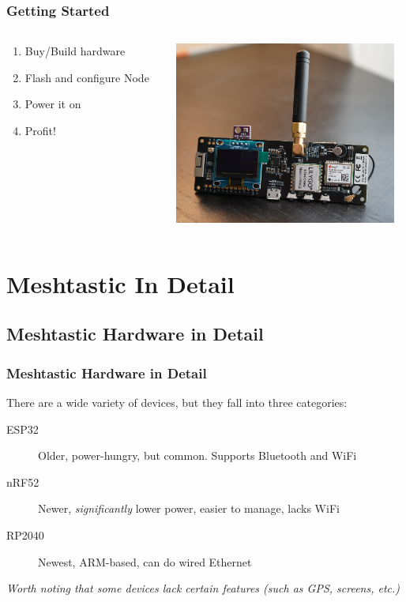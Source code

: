 \documentclass[aspectratio=169]{beamer}
\begin{document}
\begin{frame}[fragile]
  \frametitle{Getting Started}
  \begin{columns}[]
    \begin{column}[T]{0.45\paperwidth}
      \begin{enumerate}%
        \item{Buy/Build hardware}
        \item{Flash and configure Node}
        \item{Power it on}
        \item{Profit!}
      \end{enumerate}
    \end{column}
    \begin{column}[T]{0.45\paperwidth}
      \includegraphics[height=6cm,keepaspectratio]{images/tbeam.jpg}
    \end{column}
  \end{columns}
\end{frame}

\section{Meshtastic In Detail}
\subsection{Meshtastic Hardware in Detail}
\begin{frame}[fragile]
  \frametitle{Meshtastic Hardware in Detail}
  There are a wide variety of devices, but they fall into three categories:
  \begin{description}%
    \item[ESP32]{Older, power-hungry, but common. Supports Bluetooth and WiFi}
    \item[nRF52]{Newer, \emph{significantly} lower power, easier to manage, lacks WiFi}
    \item[RP2040]{Newest, ARM-based, can do wired Ethernet}
  \end{description}
  \vfill{}
  \emph{Worth noting that some devices lack certain features (such as GPS, screens, etc.)}
\end{frame}
\end{document}
